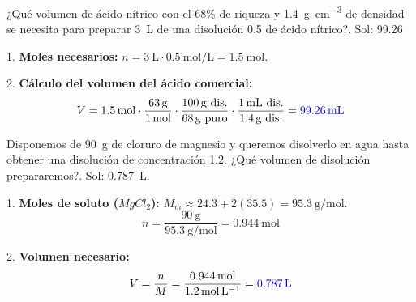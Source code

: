 \begin{exercise}
    ¿Qué volumen de ácido nítrico con el 68\% de riqueza y \qty{1.4}{\g\per\cubic\centi\metre} de densidad se necesita para preparar \qty{3}{\L} de una disolución \qty{0.5}{\M} de ácido nítrico?.
    Sol: \qty{99.26}{\cc}

    \begin{solu}
        1. \textbf{Moles necesarios:} $n = \qty{3}{\L} \cdot \qty{0.5}{\mol\per\L} = \qty{1.5}{\mol}$.

        2. \textbf{Cálculo del volumen del ácido comercial:}
        \[ V = \qty{1.5}{\mol} \cdot \dfrac{\qty{63}{\g}}{\qty{1}{\mol}} \cdot \dfrac{\qty{100}{\g} \text{ dis.}}{\qty{68}{\g} \text{ puro}} \cdot \dfrac{\qty{1}{\mL} \text{ dis.}}{\qty{1.4}{\g} \text{ dis.}} = \mathbf{\textcolor{blue}{\qty{99.26}{\mL}}} \]
    \end{solu}
\end{exercise}

\begin{exercise}
    Disponemos de \qty{90}{\g} de cloruro de magnesio y queremos disolverlo en agua hasta obtener una disolución de concentración \qty{1.2}{\M}. ¿Qué volumen de disolución prepararemos?.
    Sol: \qty{0.787}{\L}.

    \begin{solu}
        1. \textbf{Moles de soluto ($MgCl_2$):} $M_m \approx 24.3 + 2(35.5) = \qty{95.3}{\g\per\mol}$.
        \[ n = \dfrac{\qty{90}{\g}}{\qty{95.3}{\g\per\mol}} = \qty{0.944}{\mol} \]

        2. \textbf{Volumen necesario:}
        \[ V = \dfrac{n}{M} = \dfrac{\qty{0.944}{\mol}}{\qty{1.2}{\mol\per\L}} = \mathbf{\textcolor{blue}{\qty{0.787}{\L}}} \]
    \end{solu}
\end{exercise}

